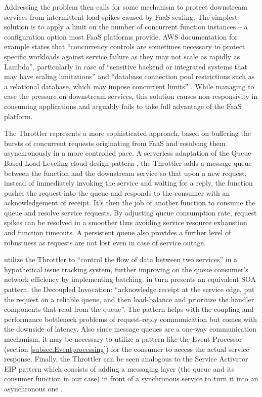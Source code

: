 Addressing the problem then calls for some mechanism to protect downstream services from intermittent load spikes caused by FaaS scaling. The simplest solution is to apply a limit on the number of concurrent function instances -- a configuration option most FaaS platforms provide. AWS documentation for example states that ``concurrency controls are sometimes necessary to protect specific workloads against service failure as they may not scale as rapidly as Lambda'', particularly in case of ``sensitive backend or integrated systems that may have scaling limitations'' and ``database connection pool restrictions such as a relational database, which may impose concurrent limits'' \parencite{aws18serverlessLens}. While managing to ease the pressure on downstream services, this solution causes non-responsivity in consuming applications and arguably fails to take full advantage of the FaaS platform.

The Throttler represents a more sophisticated approach, based on buffering the bursts of concurrent requests originating from FaaS and resolving them asynchronously in a more controlled pace. A serverless adaptation of the Queue-Based Load Leveling cloud design pattern \parencite{microsoft18cloudPatterns}, the Throttler adds a message queue between the function and the downstream service so that upon a new request, instead of immediately invoking the service and waiting for a reply, the function pushes the request into the queue and responds to the consumer with an acknowledgement of receipt. It's then the job of another function to consume the queue and resolve service requests. By adjusting queue consumption rate, request spikes can be resolved in a smoother thus avoiding service resource exhaustion and function timeouts. A persistent queue also provides a further level of robustness as requests are not lost even in case of service outage.

\textcite{baldini17currentTrends} utilize the Throttler to ``control the flow of data between two services'' in a hypothetical issue tracking system, further improving on the queue consumer's network efficiency by implementing batching. \textcite{rotem12soa} in turn presents an equivalent SOA pattern, the Decoupled Invocation: ``acknowledge receipt at the service edge, put the request on a reliable queue, and then load-balance and prioritize the handler components that read from the queue''. The pattern helps with the coupling and performance bottleneck problems of request-reply communication but comes with the downside of latency. Also since message queues are a one-way communication mechanism, it may be necessary to utilize a pattern like the Event Processor (section \ref{subsec:Eventprocessing}) for the consumer to access the actual service response. Finally, the Throttler can be seen analogous to the Service Activator EIP pattern which consists of adding a messaging layer (the queue and its consumer function in our case) in front of a synchronous service to turn it into an asynchronous one \parencite{hohpe2004enterprise}.

